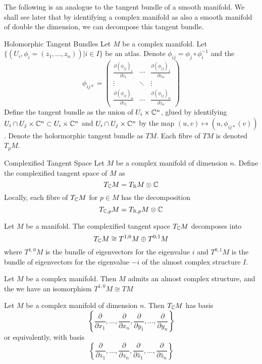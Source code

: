 \documentclass[a4paper]{article}
\begin{document}
The following is an analogue to the tangent bundle of a smooth manifold. We shall see later that by identifying a complex manifold as also a smooth manifold of double the dimension, we can decompose this tangent bundle. 

\begin{defn}{Holomorphic Tangent Bundles}{} Let $M$ be a complex manifold. Let $\{(U_i,\phi_i=(z_1,\dots,z_n))|i\in I\}$ be an atlas. Denote $\phi_{ij}=\phi_j\circ\phi_i^{-1}$ and the $$\phi_{ij\ast}=\begin{pmatrix}
\frac{\partial (\phi_{ij})_1}{\partial z_1} & \cdots & \frac{\partial (\phi_{ij})_1}{\partial z_n}\\
\vdots & \ddots & \vdots\\
\frac{\partial (\phi_{ij})_n}{\partial z_1} & \cdots & \frac{\partial (\phi_{ij})_n}{\partial z_n}
\end{pmatrix}$$ Define the tangent bundle as the union of $U_i\times\mathbb{C}^n$, glued by identifying $U_i\cap U_j\times\mathbb{C}^n\subset U_i\times\mathbb{C}^n$ and $U_i\cap U_j\times\mathbb{C}^n$ by the map $(u,v)\mapsto(u,\phi_{ij\ast}(v))$. Denote the holormorphic tangent bundle as $TM$. Each fibre of $TM$ is denoted $T_pM$. 
\end{defn}

\begin{defn}{Complexified Tangent Space}{} Let $M$ be a complex manifold of dimension $n$. Define the complexified tangent space of $M$ as $$T_{\mathbb{C}}M=T_{\mathbb{R}}M\otimes \mathbb{C}$$ Locally, each fibre of $T_{\mathbb{C}}M$ for $p\in M$ has the decomposition $$T_{\mathbb{C},p}M=T_{\mathbb{R},p}M\otimes\mathbb{C}$$
\end{defn}

\begin{prp}{}{} Let $M$ be a manifold. The complexified tangent space $T_{\mathbb{C}}M$ decomposes into $$T_{\mathbb{C}}M\cong T^{1,0}M\oplus T^{0,1}M$$ where $T^{1,0}M$ is the bundle of eigenvectors for the eigenvalue $i$ and $T^{0,1}M$ is the bundle of eigenvectors for the eigenvalue $-i$ of the almost complex structure $I$. 
\end{prp}

\begin{prp}{}{} Let $M$ be a complex manifold. Then $M$ admits an almost complex structure, and the we have an isomorphism $T^{1,0}M\cong TM$
\end{prp}

\begin{prp}{}{} Let $M$ be a complex manifold of dimension $n$. Then $T_{\mathbb{C}}M$ has basis $$\left\{\frac{\partial}{\partial x_1},\dots,\frac{\partial}{\partial x_n},\frac{\partial}{\partial y_1},\dots,\frac{\partial}{\partial y_n}\right\}$$ or equivalently, with basis $$\left\{\frac{\partial}{\partial z_1},\dots,\frac{\partial}{\partial z_n},\frac{\partial}{\partial \bar{z}_1},\dots,\frac{\partial}{\partial \bar{z}_n}\right\}$$
\end{prp}
\end{document}
